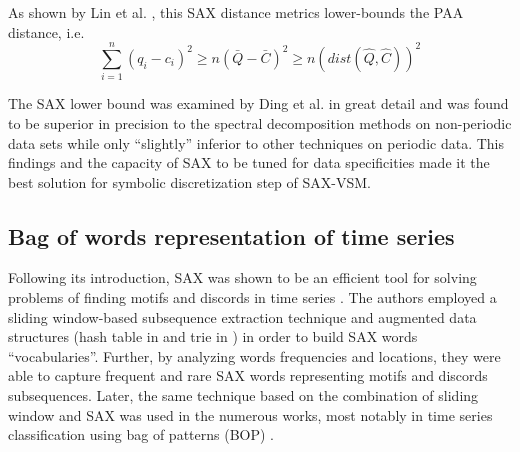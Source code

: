 As shown by Lin et al. \cite{sax}, this SAX distance metrics lower-bounds the PAA distance, i.e.
\begin{equation}
\sum_{i=1}^{n} (q_{i} - c_{i})^{2} \geq n(\bar{Q} - \bar{C})^{2} \geq n(dist(\hat{Q},\hat{C}))^2
\label{eq:sax_bounding}
\end{equation}

The SAX lower bound was examined by Ding et al. \cite{citeulike:4501572} in great detail and was found 
to be superior in precision to the spectral decomposition methods on non-periodic data sets while only
``slightly'' inferior to other techniques on periodic data. This findings and the capacity of SAX to be
tuned for data specificities made it the best solution for symbolic discretization step of SAX-VSM.

%

\subsection{Bag of words representation of time series}\label{bow_representation}
Following its introduction, SAX was shown to be an efficient tool for solving problems 
of finding motifs and discords in time series \cite{citeulike:3977965, citeulike:3175749}. 
The authors employed a sliding window-based subsequence extraction technique 
and augmented data structures (hash table in \cite{citeulike:3977965} and trie in \cite{citeulike:3175749}) 
in order to build SAX words ``vocabularies''. Further, by analyzing words frequencies 
and locations, they were able to capture frequent and rare SAX words representing 
motifs and discords subsequences. Later, the same technique based on the combination 
of sliding window and SAX was used in the numerous works, most notably in time series 
classification using bag of patterns (BOP) \cite{citeulike:10525778}. 

